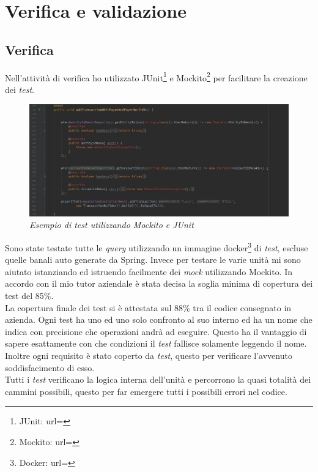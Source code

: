 \section{Verifica e validazione}
\subsection{Verifica}
Nell'attività di verifica ho utilizzato JUnit\footnote{JUnit: url= } e Mockito\footnote{Mockito: url= } per facilitare la creazione dei \textit{test}.

\begin{figure}[!ht]
	\centering
	\includegraphics[scale=0.4]{immagini/test.jpg}
	\caption{\textit{Esempio di test utilizzando Mockito e JUnit}}
\end{figure}
Sono state testate tutte le \textit{query} utilizzando un immagine docker\footnote{Docker: url= } di \textit{test}, escluse quelle banali auto generate da Spring.
Invece per testare le varie unità mi sono aiutato istanziando ed istruendo facilmente dei \textit{mock} utilizzando Mockito.
In accordo con il mio tutor aziendale è stata decisa la soglia minima di copertura dei test del 85\%.\\
La copertura finale dei test si è attestata sul 88\% tra il codice consegnato in azienda.
Ogni test ha uno ed uno solo confronto al suo interno ed ha un nome che indica con precisione che operazioni andrà ad eseguire. Questo ha il vantaggio di sapere esattamente con che condizioni il \textit{test} fallisce solamente leggendo il nome. Inoltre ogni requisito è stato coperto da \textit{test}, questo per verificare l'avvenuto soddisfacimento di esso.\\
Tutti i \textit{test} verificano la logica interna dell'unità e percorrono la quasi totalità dei cammini possibili, questo per far emergere tutti i possibili errori nel codice.
\newpage
